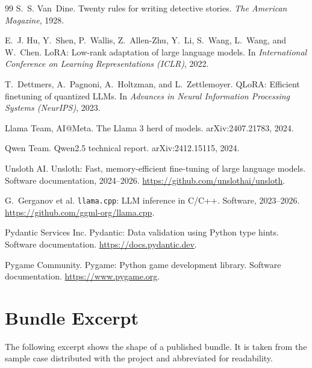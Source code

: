 ﻿\documentclass[11pt,a4paper]{report}
\begin{document}
\begin{thebibliography}{99}
S.~S. Van~Dine.
\newblock Twenty rules for writing detective stories.
\newblock \emph{The American Magazine}, 1928.

E.~J. Hu, Y.~Shen, P.~Wallis, Z.~Allen-Zhu, Y.~Li, S.~Wang, L.~Wang, and W.~Chen.
\newblock LoRA: Low-rank adaptation of large language models.
\newblock In \emph{International Conference on Learning Representations (ICLR)}, 2022.

T.~Dettmers, A.~Pagnoni, A.~Holtzman, and L.~Zettlemoyer.
\newblock QLoRA: Efficient finetuning of quantized LLMs.
\newblock In \emph{Advances in Neural Information Processing Systems (NeurIPS)}, 2023.

Llama Team, AI@Meta.
\newblock The Llama 3 herd of models.
\newblock arXiv:2407.21783, 2024.

Qwen Team.
\newblock Qwen2.5 technical report.
\newblock arXiv:2412.15115, 2024.

Unsloth AI.
\newblock Unsloth: Fast, memory-efficient fine-tuning of large language models.
\newblock Software documentation, 2024--2026. \url{https://github.com/unslothai/unsloth}.

G.~Gerganov et al.
\newblock \texttt{llama.cpp}: LLM inference in C/C++.
\newblock Software, 2023--2026. \url{https://github.com/ggml-org/llama.cpp}.

Pydantic Services Inc.
\newblock Pydantic: Data validation using Python type hints.
\newblock Software documentation. \url{https://docs.pydantic.dev}.

Pygame Community.
\newblock Pygame: Python game development library.
\newblock Software documentation. \url{https://www.pygame.org}.

\end{thebibliography}

\appendix
\chapter{Bundle Excerpt}
\label{app:bundle}

The following excerpt shows the shape of a published bundle. It is taken from the sample case distributed with the project and abbreviated for readability.
\end{document}
